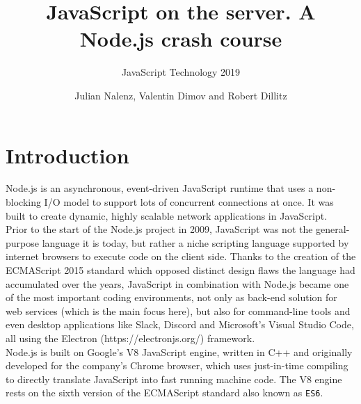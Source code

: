 \documentclass{bioinfo}
\begin{document}

\subtitle{JavaScript Technology 2019}

\title[JavaScript on the server. A Node.js crash course]{JavaScript on the server. A Node.js crash course}
\author{Julian Nalenz, Valentin Dimov and Robert Dillitz}


\maketitle

\section{Introduction}

Node.js is an asynchronous, event-driven JavaScript runtime that uses a non-blocking I/O model to support lots of concurrent connections at once. It was built to create dynamic, highly scalable network applications in JavaScript.\\ Prior to the start of the Node.js project in 2009, JavaScript was not the general-purpose language it is today, but rather a niche scripting language supported by internet browsers to execute code on the client side. Thanks to the creation of the ECMAScript 2015 standard which opposed distinct design flaws the language had accumulated over the years, JavaScript in combination with Node.js became one of the most important coding environments, not only as back-end solution for web services (which is the main focus here), but also for command-line tools and even desktop applications like Slack, Discord and Microsoft's Visual Studio Code, all using the Electron (https://electronjs.org/) framework.\\
Node.js is built on Google's V8 JavaScript engine, written in C++ and originally developed for the company's Chrome browser, which uses just-in-time compiling to directly translate JavaScript into fast running machine code. The V8 engine rests on the sixth version of the ECMAScript standard also known as \texttt{ES6}.
\end{document}
